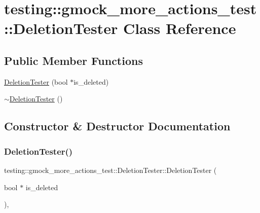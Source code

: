 \hypertarget{classtesting_1_1gmock__more__actions__test_1_1_deletion_tester}{}\section{testing\+:\+:gmock\+\_\+more\+\_\+actions\+\_\+test\+:\+:Deletion\+Tester Class Reference}
\label{classtesting_1_1gmock__more__actions__test_1_1_deletion_tester}
\subsection*{Public Member Functions}
\begin{DoxyCompactItemize}
\item 
\hyperlink{classtesting_1_1gmock__more__actions__test_1_1_deletion_tester_a3b9670fc6d29cb9d120fb0fdd2ba68d8}{Deletion\+Tester} (bool $\ast$is\+\_\+deleted)
\item 
\hyperlink{classtesting_1_1gmock__more__actions__test_1_1_deletion_tester_ac79602dcb18df1747b086d7118e7e5f7}{$\sim$\+Deletion\+Tester} ()
\end{DoxyCompactItemize}


\subsection{Constructor \& Destructor Documentation}
\mbox{\label{classtesting_1_1gmock__more__actions__test_1_1_deletion_tester_a3b9670fc6d29cb9d120fb0fdd2ba68d8}} 
\subsubsection{\texorpdfstring{Deletion\+Tester()}{DeletionTester()}}
{\footnotesize\ttfamily testing\+::gmock\+\_\+more\+\_\+actions\+\_\+test\+::\+Deletion\+Tester\+::\+Deletion\+Tester (\begin{DoxyParamCaption}\item[{bool $\ast$}]{is\+\_\+deleted }\end{DoxyParamCaption})\hspace{0.3cm}{\ttfamily [inline]}, {\ttfamily [explicit]}}

